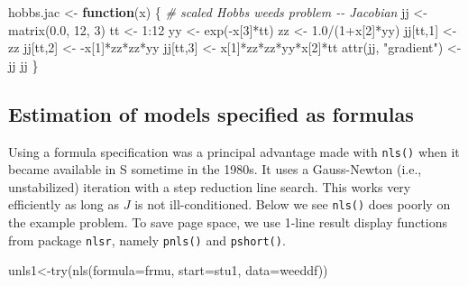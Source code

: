 \documentclass[
]{article}
\newenvironment{Shaded}{\begin{snugshade}}{\end{snugshade}}
\newcommand{\AttributeTok}[1]{\textcolor[rgb]{0.77,0.63,0.00}{#1}}
\newcommand{\CommentTok}[1]{\textcolor[rgb]{0.56,0.35,0.01}{\textit{#1}}}
\newcommand{\ControlFlowTok}[1]{\textcolor[rgb]{0.13,0.29,0.53}{\textbf{#1}}}
\newcommand{\DecValTok}[1]{\textcolor[rgb]{0.00,0.00,0.81}{#1}}
\newcommand{\FloatTok}[1]{\textcolor[rgb]{0.00,0.00,0.81}{#1}}
\newcommand{\FunctionTok}[1]{\textcolor[rgb]{0.00,0.00,0.00}{#1}}
\newcommand{\NormalTok}[1]{#1}
\newcommand{\OtherTok}[1]{\textcolor[rgb]{0.56,0.35,0.01}{#1}}
\newcommand{\SpecialCharTok}[1]{\textcolor[rgb]{0.00,0.00,0.00}{#1}}
\newcommand{\StringTok}[1]{\textcolor[rgb]{0.31,0.60,0.02}{#1}}
\begin{document}
\begin{Shaded}
\begin{Highlighting}[]
\NormalTok{hobbs.jac  }\OtherTok{\textless{}{-}}  \ControlFlowTok{function}\NormalTok{(x) \{ }\CommentTok{\# scaled Hobbs weeds problem {-}{-} Jacobian}
\NormalTok{  jj  }\OtherTok{\textless{}{-}}  \FunctionTok{matrix}\NormalTok{(}\FloatTok{0.0}\NormalTok{, }\DecValTok{12}\NormalTok{, }\DecValTok{3}\NormalTok{)}
\NormalTok{  tt  }\OtherTok{\textless{}{-}}  \DecValTok{1}\SpecialCharTok{:}\DecValTok{12}
\NormalTok{  yy  }\OtherTok{\textless{}{-}}  \FunctionTok{exp}\NormalTok{(}\SpecialCharTok{{-}}\NormalTok{x[}\DecValTok{3}\NormalTok{]}\SpecialCharTok{*}\NormalTok{tt)}
\NormalTok{  zz  }\OtherTok{\textless{}{-}}  \FloatTok{1.0}\SpecialCharTok{/}\NormalTok{(}\DecValTok{1}\SpecialCharTok{+}\NormalTok{x[}\DecValTok{2}\NormalTok{]}\SpecialCharTok{*}\NormalTok{yy)}
\NormalTok{  jj[tt,}\DecValTok{1}\NormalTok{]   }\OtherTok{\textless{}{-}}\NormalTok{   zz}
\NormalTok{  jj[tt,}\DecValTok{2}\NormalTok{]   }\OtherTok{\textless{}{-}}   \SpecialCharTok{{-}}\NormalTok{x[}\DecValTok{1}\NormalTok{]}\SpecialCharTok{*}\NormalTok{zz}\SpecialCharTok{*}\NormalTok{zz}\SpecialCharTok{*}\NormalTok{yy}
\NormalTok{  jj[tt,}\DecValTok{3}\NormalTok{]   }\OtherTok{\textless{}{-}}\NormalTok{   x[}\DecValTok{1}\NormalTok{]}\SpecialCharTok{*}\NormalTok{zz}\SpecialCharTok{*}\NormalTok{zz}\SpecialCharTok{*}\NormalTok{yy}\SpecialCharTok{*}\NormalTok{x[}\DecValTok{2}\NormalTok{]}\SpecialCharTok{*}\NormalTok{tt}
  \FunctionTok{attr}\NormalTok{(jj, }\StringTok{"gradient"}\NormalTok{) }\OtherTok{\textless{}{-}}\NormalTok{ jj}
\NormalTok{  jj}
\NormalTok{\}}
\end{Highlighting}
\end{Shaded}

\hypertarget{estimation-of-models-specified-as-formulas}{%
\subsection{Estimation of models specified as
formulas}\label{estimation-of-models-specified-as-formulas}}

Using a formula specification was a principal advantage made with
\texttt{nls()} when it became available in S sometime in the 1980s. It
uses a Gauss-Newton (i.e., unstabilized) iteration with a step reduction
line search. This works very efficiently as long as \(J\) is not
ill-conditioned. Below we see \texttt{nls()} does poorly on the example
problem. To save page space, we use 1-line result display functions from
package \texttt{nlsr}, namely \texttt{pnls()} and \texttt{pshort()}.

\begin{Shaded}
\begin{Highlighting}[]
\NormalTok{unls1}\OtherTok{\textless{}{-}}\FunctionTok{try}\NormalTok{(}\FunctionTok{nls}\NormalTok{(}\AttributeTok{formula=}\NormalTok{frmu, }\AttributeTok{start=}\NormalTok{stu1, }\AttributeTok{data=}\NormalTok{weeddf))}
\end{Highlighting}
\end{Shaded}
\end{document}
